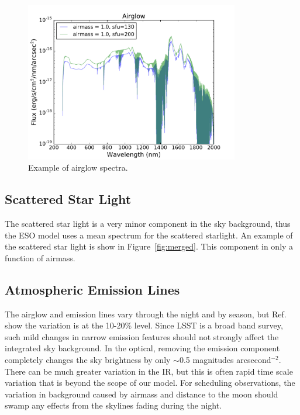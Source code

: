 \documentclass[]{spie}
\begin{document}
\begin{figure}[ht]
\begin{center}
  \includegraphics[height=7cm]{plots/airglow.pdf}
  \end{center}
  \caption{Example of airglow spectra. \label{fig:airglow}}
\end{figure}

  

\subsection{Scattered Star Light}

The scattered star light is a very minor component in the sky background, thus the ESO model uses a mean spectrum for the scattered starlight.  An example of the scattered star light is show in Figure~\ref{fig:merged}. This component in only a function of airmass.


\subsection{Atmospheric Emission Lines}

The airglow and emission lines vary through the night and by season, but Ref.~ show the variation is at the 10-20\% level.  Since LSST is a broad band survey, such mild changes in narrow emission features should not strongly affect the integrated sky background. In the optical, removing the emission component completely changes the sky brightness by only $\sim$0.5 magnitudes arcsecond$^{-2}$.  There can be much greater variation in the IR, but this is often rapid time scale variation that is beyond the scope of our model.  For scheduling observations, the variation in background caused by airmass and distance to the moon should swamp any effects from the skylines fading during the night.
\end{document}
